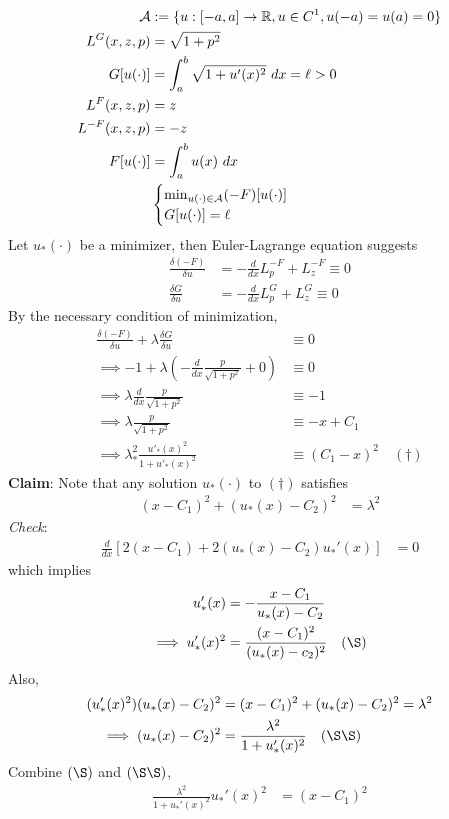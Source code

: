 \documentclass{article}
\begin{document}
	\begin{example}
		\begin{align}
			\mathcal{{A}} &:= \{
			u: [-a, a] \to \mathbb{R}, u \in C^1, u(-a) = u(a) = 0
			\} \\
			L^G(x, z, p) &= \sqrt{1 + p^2} \\
			G[u(\cdot)] &= \int_a^b \sqrt{1 + u'(x)^2}\ dx = \ell > 0 \\
			L^F(x, z, p) &= z \\
			L^{-F}(x, z, p) &= -z \\
			F[u(\cdot)] &= \int_a^b u(x)\ dx \\
			&\begin{cases}
				\min_{u(\cdot) \in \mathcal{{A}}} (-F)[u(\cdot)] \\
				G[u(\cdot)] = \ell
			\end{cases}
		\end{align}
		Let $u_*(\cdot)$ be a minimizer, then Euler-Lagrange equation suggests 
		\begin{align}
			\frac{\delta (-F)}{\delta u} &= - \frac{d}{dx} L_p^{-F} + L_z^{-F} \equiv 0 \\
			\frac{\delta G}{\delta u} &= - \frac{d}{dx} L_p^G + L_z^G \equiv 0
		\end{align}
		By the necessary condition of minimization,
		\begin{align}
			\frac{\delta (-F)}{\delta u} + \lambda \frac{\delta G}{\delta u} &\equiv 0 \\
			\implies -1 + \lambda \left(
			- \frac{d}{dx} \frac{p}{\sqrt{1+p^2}} + 0 \right) &\equiv 0 \\
			\implies \lambda \frac{d}{dx} \frac{p}{\sqrt{1+p^2}} &\equiv -1 \\
			\implies \lambda \frac{p}{\sqrt{1+p^2}} &\equiv -x + C_1 \\
			\implies \lambda_*^2 \frac{u'_*(x)^2}{1 + u'_*(x)^2} &\equiv (C_1 - x)^2\quad  (\dagger)
		\end{align}
		\textbf{Claim}: Note that any solution $u_*(\cdot)$ to $(\dagger)$ satisfies
		\begin{align}
			(x-C_1)^2 + (u_*(x) - C_2)^2 &= \lambda^2
		\end{align}
		\emph{Check}: 
		\begin{align}
			\frac{d}{dx} \left[ 2(x - C_1) + 2(u_*(x) - C_2)u_*'(x) \right] &= 0
		\end{align}
		which implies
		\begin{align}
			u'_*(x) &= - \frac{x - C_1}{u_*(x) - C_2} \\
			\implies u'_*(x)^2 &= \frac{(x - C_1)^2}{(u_*(x) - c_2)^2}\quad (\S)
		\end{align}
		Also, 
		\begin{align}
			(u_*'(x)^2)(u_*(x) - C_2)^2  &= (x - C_1)^2 + (u_*(x) - C_2)^2 = \lambda^2 \\
			\implies (u_*(x) - C_2)^2 &= \frac{\lambda^2}{1 + u'_*(x)^2}\quad (\S \S)
		\end{align}
		Combine $(\S)$ and $(\S \S)$,
		\begin{align}
			\frac{\lambda^2}{1 + u_*'(x)^2} u_*'(x)^2 &= (x - C_1)^2
		\end{align}
	\end{example}
	
\end{document}
